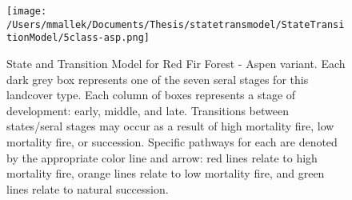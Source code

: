 \begin{figure}[htbp]
\centering
\texttt{[image: /Users/mmallek/Documents/Thesis/statetransmodel/StateTransitionModel/5class-asp.png]}
\caption{State and Transition Model for Red Fir Forest - Aspen variant. Each dark grey box represents one of the seven seral stages for this landcover type. Each column of boxes represents a stage of development: early, middle, and late. Transitions between states/seral stages may occur as a result of high mortality fire, low mortality fire, or succession. Specific pathways for each are denoted by the appropriate color line and arrow: red lines relate to high mortality fire, orange lines relate to low mortality fire, and green lines relate to natural succession.} 
\label{transmodel_rfr-asp}
\end{figure}



